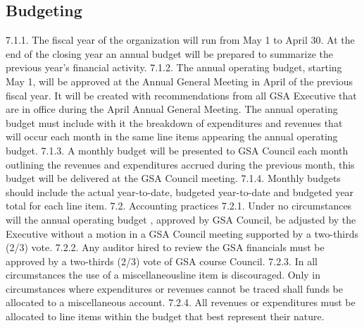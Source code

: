 \documentclass{article}
\begin{document}
\subsection{Budgeting }
7.1.1. The fiscal year of the organization will run from May 1 to April 30. At 
the end of the closing year an annual budget will be prepared to 
summarize the previous year’s financial activity. 
7.1.2. The annual operating budget, starting May 1, will be approved at the 
Annual General Meeting in April of the previous fiscal year. It will be 
created with recommendations from all GSA Executive that are in 
office during the April Annual General Meeting. The annual operating 
budget must include with it the breakdown of expenditures and 
revenues that will occur each month in the same line items appearing 
the annual operating budget. 
7.1.3. A monthly budget will be presented to GSA Council each month 
outlining the revenues and expenditures accrued during the previous 
month, this budget will be delivered at the GSA Council meeting. 
7.1.4. Monthly budgets should include the actual year-to-date, budgeted 
year-to-date and budgeted year total for each line item. 
7.2. Accounting practices 
7.2.1. Under no circumstances will the annual operating budget , approved 
by GSA Council, be adjusted by the Executive without a motion in a 
GSA Council meeting supported by a two-thirds (2/3) vote. 
7.2.2. Any auditor hired to review the GSA financials must be approved by a 
two-thirds (2/3) vote of GSA course Council. 
7.2.3. In all circumstances the use of a miscellaneousline item is 
discouraged. Only in circumstances where expenditures or revenues 
cannot be traced shall funds be allocated to a miscellaneous account. 
7.2.4. All revenues or expenditures must be allocated to line items within the 
budget that best represent their nature. 
\end{document}
